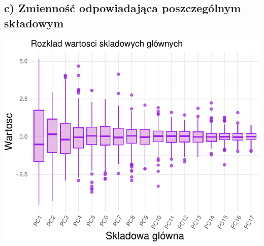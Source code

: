 \documentclass[
  12pt,
]{article}
\begin{document}
\subsection{c) Zmienność odpowiadająca poszczególnym
składowym}\label{c-zmiennoux15bux107-odpowiadajux105ca-poszczeguxf3lnym-skux142adowym}

\begin{center}\includegraphics{Sprawozdanie2_files/figure-latex/rozklad_wartosci_wykres_boxplot-1} \end{center}
\end{document}
